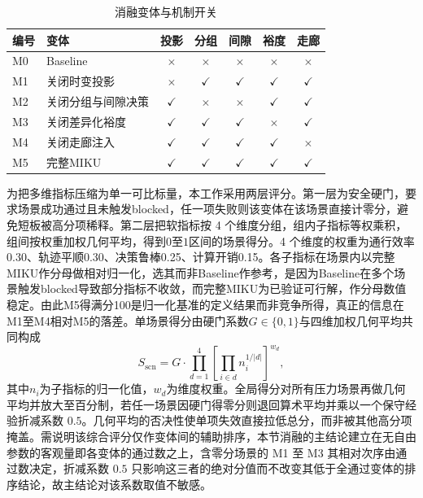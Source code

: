 \documentclass[a4paper,11pt]{ctexart}
\theoremstyle{definition}
\begin{document}
\begin{table}[htbp]
\centering
\caption{消融变体与机制开关}
\label{tab:exp_ablation_matrix}
\small
\begin{tabular}{llccccc}
\toprule
\textbf{编号} & \textbf{变体} & 投影 & 分组 & 间隙 & 裕度 & 走廊 \\
\midrule
M0 & Baseline             & $\times$    & $\times$    & $\times$    & $\times$    & $\times$    \\
M1 & 关闭时变投影         & $\times$    & $\checkmark$ & $\checkmark$ & $\checkmark$ & $\checkmark$ \\
M2 & 关闭分组与间隙决策   & $\checkmark$ & $\times$    & $\times$    & $\checkmark$ & $\checkmark$ \\
M3 & 关闭差异化裕度       & $\checkmark$ & $\checkmark$ & $\checkmark$ & $\times$    & $\checkmark$ \\
M4 & 关闭走廊注入         & $\checkmark$ & $\checkmark$ & $\checkmark$ & $\checkmark$ & $\times$    \\
M5 & 完整MIKU             & $\checkmark$ & $\checkmark$ & $\checkmark$ & $\checkmark$ & $\checkmark$ \\
\bottomrule
\end{tabular}
\end{table}

为把多维指标压缩为单一可比标量，本工作采用两层评分。第一层为安全硬门，要求场景成功通过且未触发blocked，任一项失败则该变体在该场景直接计零分，避免短板被高分项稀释。第二层把软指标按 4 个维度分组，组内子指标等权乘积，组间按权重加权几何平均，得到$0$至$1$区间的场景得分。4 个维度的权重为通行效率0.30、轨迹平顺0.30、决策鲁棒0.25、计算开销0.15。各子指标在场景内以完整MIKU作分母做相对归一化，选其而非Baseline作参考，是因为Baseline在多个场景触发blocked导致部分指标不收敛，而完整MIKU为已验证可行解，作分母数值稳定。由此M5得满分100是归一化基准的定义结果而非竞争所得，真正的信息在M1至M4相对M5的落差。单场景得分由硬门系数$G \in \{0, 1\}$与四维加权几何平均共同构成
\begin{equation}
S_{\mathrm{scn}} = G \cdot \prod_{d=1}^{4} \left[ \prod_{i \in d} n_i^{1/|d|} \right]^{w_d},
\label{eq:exp_score_scn}
\end{equation}
其中$n_i$为子指标的归一化值，$w_d$为维度权重。全局得分对所有压力场景再做几何平均并放大至百分制，若任一场景因硬门得零分则退回算术平均并乘以一个保守经验折减系数 $0.5$。几何平均的否决性使单项失效直接拉低总分，而非被其他高分项掩盖。需说明该综合评分仅作变体间的辅助排序，本节消融的主结论建立在无自由参数的客观量即各变体的通过数之上，含零分场景的 M1 至 M3 其相对次序由通过数决定，折减系数 $0.5$ 只影响这三者的绝对分值而不改变其低于全通过变体的排序结论，故主结论对该系数取值不敏感。
\end{document}
